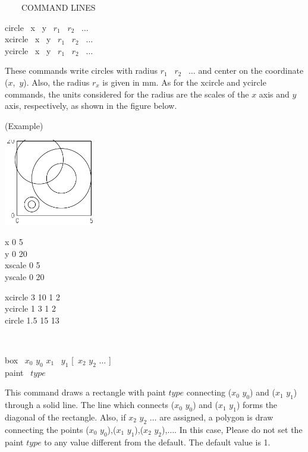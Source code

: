 \begin{qsection}{\ ~~~COMMAND LINES}
\begin{minipage}[t]{5.5cm}
circle ~x ~y ~$r_1$ ~$r_2$ ~$\dots$\\
xcircle ~x ~y ~$r_1$ ~$r_2$ ~$\dots$\\
ycircle ~x ~y ~$r_1$ ~$r_2$ ~$\dots$

\end{minipage}
\begin{minipage}[t]{9cm}
These commands write circles with radius $r_1$ ~$r_2$ ~$\dots$
and center on the coordinate ($x$,~$y$).
Also, the radius $r_x$ is given in mm.
As for the xcircle and ycircle commands,
the units considered for the radius are the scales of the $x$ axis and
 $y$ axis, respectively, as shown in the figure below.

(Example)\\
\begin{minipage}[t]{4.3cm}
 \includegraphics[width=4cm]{fig/circle.pdf}
\end{minipage}
\begin{minipage}[b]{4.5cm}
\baselineskip 5pt
x 0 5\\
y 0 20\\
xscale 0 5\\
yscale 0 20

\vspace*{3mm}
xcircle 3 10 1 2\\
ycircle 1 3 1 2\\
circle  1.5 15 13\\
\vspace*{7mm}
\end{minipage}
\end{minipage}\\

\begin{minipage}[t]{5.5cm}
box ~$x_0$ $y_0$ $x_1$ ~$y_1$ [~$x_2$ $y_2$ $\dots$ ]\\
paint ~$type$
\end{minipage}
\begin{minipage}[t]{9cm}
This command draws a rectangle with paint $type$
connecting ($x_0$ $y_0$) and ($x_1$ $y_1$) through a solid line.
The line which connects ($x_0$ $y_0$) and ($x_1$ $y_1$) forms
the diagonal of the rectangle.
Also, if $x_2$ $y_2$ $\dots$ are assigned, a polygon is draw connecting
the points ($x_0$ $y_0$),($x_1$ $y_1$),($x_2$ $y_2$),$\dots$.
In this case, Please do not set the paint $type$
 to any value different from the default.
The default value is 1.\\


\end{minipage}
\end{qsection}

